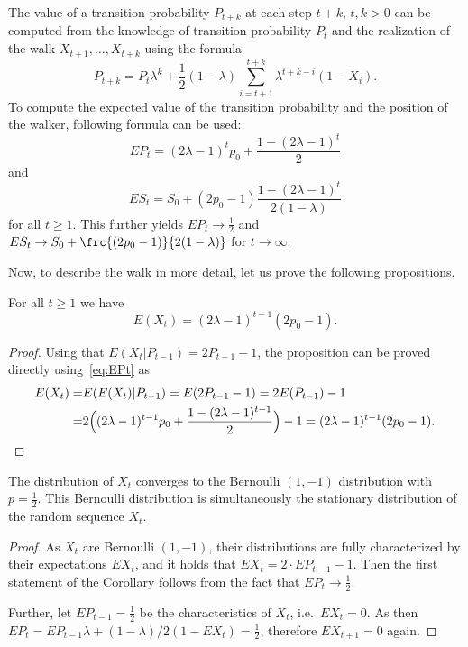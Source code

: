 The value of a transition probability $P_{t+k}$ at
each step $t+k$, $t,k>0$ can be computed from the knowledge of
transition probability $P_{t}$ and the realization of the walk
$X_{t+1},\dots,X_{t+k}$ using the formula
\begin{equation}
P_{t+k}=P_{t}\lambda^{k}+\frac{1}{2}(1-\lambda)\sum_{i=t+1}^{t+k}\lambda^{t+k-i}(1-X_{i}).\label{eq:Pt}
\end{equation}
To compute the expected value of the transition probability and the position of the walker, following formula can be used:
\begin{equation}
EP_{t}=(2\lambda-1)^{t}p_{0}+\frac{1-(2\lambda-1)^{t}}{2}\label{eq:EPt}
\end{equation}
and
\begin{equation}
ES_{t}=S_{0}+(2p_{0}-1)\frac{1-(2\lambda-1)^{t}}{2(1-\lambda)}\label{eq:ESt}
\end{equation}
for all $t\geq1$.
This further yields $EP_{t}\rightarrow\frac{1}{2}$
and $ES_{t}\rightarrow S_{0}+\frc{(2p_{0}-1)}{2(1-\lambda)}$ for $t\rightarrow \infty$.

Now, to describe the walk in more detail, let us
prove the following propositions.


\begin{proposition}
\label{PropEXt-succes}
For all $t\geq1$ we have
\begin{equation}
E(X_{t})=(2\lambda-1)^{t-1}(2p_{0}-1).
\end{equation}
\end{proposition}

\begin{proof}
Using that $E(X_{t}|P_{t-1})=2P_{t-1}-1$, the proposition can be
proved directly using~\eqref{eq:EPt} as
$$
\aligned
E(X_{t})=&E(E(X_{t})|P_{t-1})=E(2P_{t-1}-1)=2E(P_{t-1})-1\\
=&2\Big((2\lambda-1)^{t-1}p_{0}+\frac{1-(2\lambda-1)^{t-1}}{2}\Big)-1=(2\lambda-1)^{t-1}(2p_{0}-1).\\
\endaligned
$$
\end{proof}

\begin{corollary}
\label{cor-stac-dist}
The distribution of $X_t$ converges to the Bernoulli $(1,-1)$ distribution with
$p=\frac{1}{2}$.
This Bernoulli distribution is simultaneously the stationary distribution of the random sequence $X_t$.
\end{corollary}



\begin{proof}
As $X_t$ are Bernoulli $(1,-1)$, their distributions are fully characterized by their expectations $EX_t$, and it holds that
$EX_t=2\cdot EP_{t-1}-1$.
Then the first statement of the Corollary follows from the fact that $EP_t\to \frac{1}{2}.$

Further, let $EP_{t-1}=\frac{1}{2}$ be the characteristics of $X_t$, i.e.~$EX_t=0$.
As then
$EP_t=EP_{t-1}\lambda+(1-\lambda)/2(1-EX_t)=\frac{1}{2}$, therefore $EX_{t+1}=0$ again.
\end{proof}

